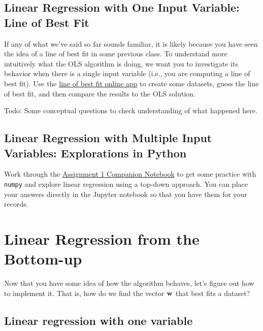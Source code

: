 \documentclass[assignment01_Solutions]{subfiles}
\begin{document}
\subsection{Linear Regression with One Input Variable: Line of Best Fit}

If any of what we've said so far sounds familiar, it is likely because you have seen the idea of a line of best fit in some previous class.  To understand more intuitively what the OLS algorithm is doing, we want you to investigate its behavior when there is a single input variable (i.e., you are computing a line of best fit).  Use the \href{http://www.shodor.org/interactivate/activities/Regression/}{line of best fit online app} to create some datasets, guess the line of best fit, and then compare the results to the OLS solution.


\begin{exercise}
Todo: Some conceptual questions to check understanding of what happened here.
\end{exercise}



\subsection{Linear Regression with Multiple Input Variables: Explorations in Python}
Work through the \href{https://colab.research.google.com/drive/12pLbQkhrPoI-22FVV6gZNObi1IJCW-mF}{Assignment 1 Companion Notebook} to get some practice with {\tt numpy} and explore linear regression using a top-down approach.  You can place your answers directly in the Jupyter notebook so that you have them for your records.

\section{Linear Regression from the Bottom-up}

Now that you have some idea of how the algorithm behaves, let's figure out how to implement it.  That is, how do we find the vector $\mathbf{w}$ that best fits a dataset?

\subsection{Linear regression with one variable}
\end{document}
